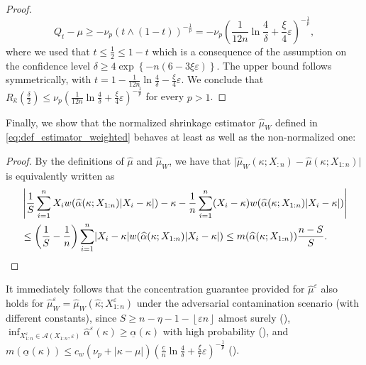\documentclass{article}
\theoremstyle{plain}
\newtheorem{proposition}[theorem]{Proposition}
\theoremstyle{definition}
\def\R{\mathbb{R}} %
\def\sA{\mathcal{A}}
\begin{document}
\begin{appendix}
\begin{proof}
 \[
   Q_t -\mu \ge - \nu_p (t \wedge (1-t))^{-\frac{1}{p}} =  -\nu_p\left(\frac{1}{12n} \ln \frac{4}{\delta } + \frac{\xi}{4} \varepsilon \right)^{-\frac{1}{p}},
 \] 
 where we used that \( t \le \frac{1}{2} \le 1-t \) which is a consequence of the assumption on the confidence level \( \delta \ge 4\exp\left\{-n(6-3\xi \varepsilon )\right\} \). 
 The upper bound follows symmetrically, with \( t=1-\frac{1}{12n}\ln \frac{4}{\delta } -\frac{\xi}{4}\varepsilon  \). We conclude that \( R_{\widehat{\kappa } }\left(\frac{\delta}{2}\right) \le \nu_p\left(\frac{1}{12n} \ln \frac{4}{\delta } + \frac{\xi}{4}\varepsilon \right)^{-\frac{1}{p}}    \) for every \( p>1 \).
\end{proof}

Finally, we show that the normalized shrinkage estimator \( \widehat{\mu }_W  \) defined in \eqref{eq:def_estimator_weighted} behaves at least as well as the non-normalized one:

\begin{proof}
  By the definitions of \( \widehat{\mu }  \) and \( \widehat{\mu }_W  \), we have that \( \lvert \widehat{\mu }_W(\kappa;X_{:n})-\widehat{\mu }(\kappa ;X_{1:n}) \rvert \) is equivalently written as
  \begin{align*}
    &\left\lvert \frac{1}{S}\sum_{i=1}^n X_iw(\widehat{\alpha }(\kappa; X_{1:n} ) \lvert X_i-\kappa  \rvert  ) - \kappa - \frac{1}{n}\sum_{i=1}^n (X_i-\kappa )w(\widehat{\alpha }(\kappa; X_{1:n} ) \lvert X_i-\kappa  \rvert  ) \right\rvert \\
       &\le \left(\frac{1}{S}-\frac{1}{n}\right)\sum_{i=1}^n \lvert X_i-\kappa \rvert w(\widehat{\alpha }(\kappa;X_{1:n} ) \lvert X_i-\kappa  \rvert  )\le m(\widehat{\alpha }(\kappa;X_{1:n} ) )\frac{n-S}{S}.\qedhere
  \end{align*} 
\end{proof}
It immediately follows that the concentration guarantee provided for \( \widehat{\mu }^\varepsilon   \) also holds for \( \widehat{\mu }_W^\varepsilon=\widehat{\mu }_W(\widehat{\kappa }; X_{1:n}^\varepsilon  )    \) under the adversarial contamination scenario (with different constants), since \( S \ge n-\eta -1 - \left\lfloor \varepsilon n \right\rfloor\) almost surely (), \( \inf_{X_{1:n}^\varepsilon \in \sA(X_{1:n},\varepsilon )}\widehat{\alpha }^\varepsilon (\kappa ) \ge \underline{\alpha }(\kappa )  \) with high probability (), and \( m(\underline{\alpha }(\kappa ))\le c_w(\nu_p + \lvert \kappa -\mu  \rvert ) \left(\frac{\underline{c}}{n}\ln \frac{4}{\delta } + \frac{\xi}{7}\varepsilon \right)^{-\frac{1}{p}}  \) ().


\end{appendix}
\end{document}
